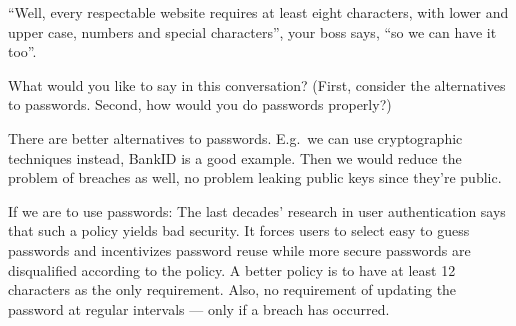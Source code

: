 \question[3]
\enquote{Well, every respectable website requires at least eight characters, 
with lower and upper case, numbers and special characters}, your boss says, 
\enquote{so we can have it too}.

What would you like to say in this conversation?
(First, consider the alternatives to passwords.
Second, how would you do passwords properly?)

\begin{solution}
There are better alternatives to passwords.
E.g.\ we can use cryptographic techniques instead, BankID is a good example.
Then we would reduce the problem of breaches as well, no problem leaking public 
keys since they're public.

If we are to use passwords: The last decades' research in user authentication 
says that such a policy yields bad security.
It forces users to select easy to guess passwords and incentivizes password 
reuse while more secure passwords are disqualified according to the policy.
A better policy is to have at least 12 characters as the only requirement.
Also, no requirement of updating the password at regular intervals --- only if a 
breach has occurred.
\end{solution}
\question[3]



